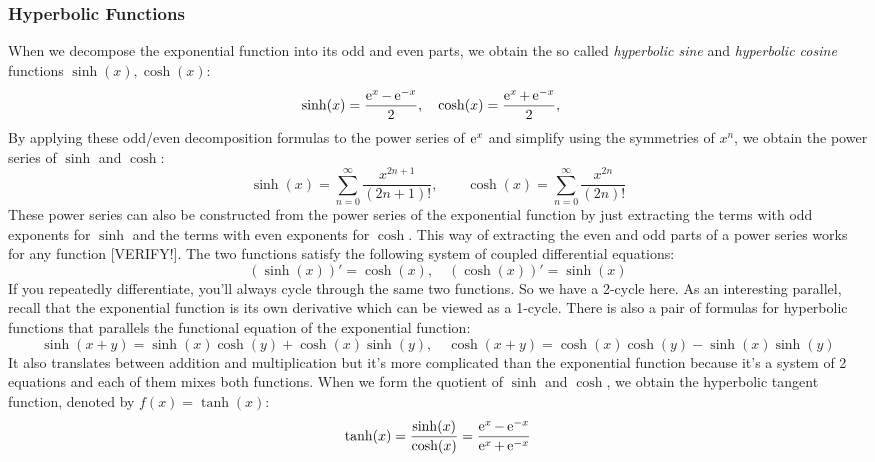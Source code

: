 \subsubsection{Hyperbolic Functions}
When we decompose the exponential function into its odd and even parts, we obtain the so called \emph{hyperbolic sine} and \emph{hyperbolic cosine} functions $\sinh(x), \cosh(x)$:
\begin{equation}
\sinh(x) =	\frac{\operatorname{\mathrm{e}}^x - \operatorname{\mathrm{e}}^{-x}}{2}, \quad	
\cosh(x) =	\frac{\operatorname{\mathrm{e}}^x + \operatorname{\mathrm{e}}^{-x}}{2}, \quad
\end{equation}
By applying these odd/even decomposition formulas to the power series of $\operatorname{\mathrm{e}}^x$ and simplify using the symmetries of $x^n$, we obtain the power series of $\sinh$ and $\cosh$: 
\begin{equation}
\sinh(x) = \sum_{n=0}^{\infty} \frac{x^{2n+1}}{(2n+1)!}, \qquad
\cosh(x) = \sum_{n=0}^{\infty} \frac{x^{2n}  }{(2n)!}
\end{equation}
These power series can also be constructed from the power series of the exponential function by just extracting the terms with odd exponents for $\sinh$ and the terms with even exponents for $\cosh$. This way of extracting the even and odd parts of a power series works for any function [VERIFY!]. The two functions satisfy the following system of coupled differential equations:
\begin{equation}
(\sinh(x))' = \cosh(x), \quad
(\cosh(x))' = \sinh(x)
\end{equation} 
If you repeatedly differentiate, you'll always cycle through the same two functions. So we have a 2-cycle here. As an interesting parallel, recall that the exponential function is its own derivative which can be viewed as a 1-cycle. There is also a pair of formulas for hyperbolic functions that parallels the functional equation of the exponential function:
\begin{equation}
\sinh(x+y) = \sinh(x) \cosh(y) + \cosh(x) \sinh(y), \quad
\cosh(x+y) = \cosh(x) \cosh(y) - \sinh(x) \sinh(y)
\end{equation}
It also translates between addition and multiplication but it's more complicated than the exponential function because it's a system of 2 equations and each of them mixes both functions. When we form the quotient of $\sinh$ and $\cosh$, we obtain the hyperbolic tangent function, denoted by $f(x) = \tanh(x)$:
\begin{equation}
\tanh(x) =	\frac{\sinh(x)}{\cosh(x)} 
         = \frac{\operatorname{\mathrm{e}}^x - \operatorname{\mathrm{e}}^{-x}}{\operatorname{\mathrm{e}}^x + \operatorname{\mathrm{e}}^{-x}}
\end{equation}





